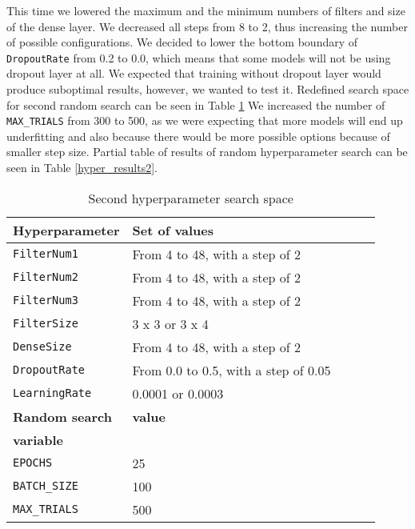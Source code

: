 This time we lowered the maximum and the minimum numbers of filters and size of the dense layer.
We decreased all steps from 8 to 2, thus increasing the number of possible configurations.
We decided to lower the bottom boundary of \verb|DropoutRate| from 0.2 to 0.0, which means that some models will not be using dropout layer at all.
We expected that training without dropout layer would produce suboptimal results, however, we wanted to test it.
Redefined search space for second random search can be seen in Table \ref{hyper_table2}
We increased the number of \verb|MAX_TRIALS| from 300 to 500, as we were expecting that more models will end up underfitting and also because there would be more possible options because of smaller step size.
Partial table of results of random hyperparameter search can be seen in Table \ref{hyper_results2}.

\begin{table}[ht]
    \centering
    \caption{ Second hyperparameter search space}
    \begin{tabular}{@{} *5l @{}}    \toprule
        \textbf{Hyperparameter} & \textbf{Set of values}\\\midrule
        \verb|FilterNum1|       & From 4 to 48, with a step of 2\\ 
        \verb|FilterNum2|       & From 4 to 48, with a step of 2\\ 
        \verb|FilterNum3|       & From 4 to 48, with a step of 2\\
        \verb|FilterSize|       & 3 x 3 or 3 x 4\\
        \verb|DenseSize|        & From 4 to 48, with a step of 2\\
        \verb|DropoutRate|      & From 0.0 to 0.5, with a step of 0.05\\
        \verb|LearningRate|     & 0.0001 or 0.0003\\\toprule
        \textbf{Random search}  & \textbf{value}\\
        \textbf{variable}       & \\\midrule
        \verb|EPOCHS|           & 25\\
        \verb|BATCH_SIZE|       & 100\\
        \verb|MAX_TRIALS|       & 500\\\bottomrule
    \end{tabular}
    \label{hyper_table2}
\end{table}

